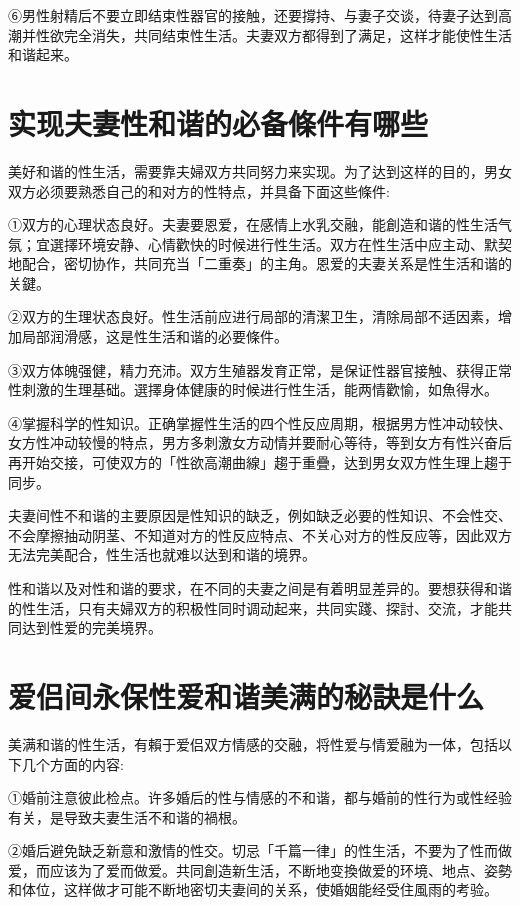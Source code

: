 \documentclass[12pt,UTF8]{ctexbook}
\begin{document}
⑥男性射精后不要立即结束性器官的接触，还要撐持、与妻子交谈，待妻子达到高潮并性欲完全消失，共同结束性生活。夫妻双方都得到了满足，这样才能使性生活和谐起来。

\section{实现夫妻性和谐的必备條件有哪些}

美好和谐的性生活，需要靠夫婦双方共同努力来实现。为了达到这样的目的，男女双方必须要熟悉自己的和对方的性特点，并具备下面这些條件:

①双方的心理状态良好。夫妻要恩爱，在感情上水乳交融，能創造和谐的性生活气氛；宜選擇环境安静、心情歡快的时候进行性生活。双方在性生活中应主动、默契地配合，密切协作，共同充当「二重奏」的主角。恩爱的夫妻关系是性生活和谐的关鍵。

②双方的生理状态良好。性生活前应进行局部的清潔卫生，清除局部不适因素，增加局部润滑感，这是性生活和谐的必要條件。

③双方体魄强健，精力充沛。双方生殖器发育正常，是保证性器官接触、获得正常性刺激的生理基础。選擇身体健康的时候进行性生活，能两情歡愉，如魚得水。

④掌握科学的性知识。正确掌握性生活的四个性反应周期，根据男方性冲动较快、女方性冲动较慢的特点，男方多刺激女方动情并要耐心等待，等到女方有性兴奋后再开始交接，可使双方的「性欲高潮曲線」趨于重疊，达到男女双方性生理上趨于同步。

夫妻间性不和谐的主要原因是性知识的缺乏，例如缺乏必要的性知识、不会性交、不会摩擦抽动阴茎、不知道对方的性反应特点、不关心对方的性反应等，因此双方无法完美配合，性生活也就难以达到和谐的境界。

性和谐以及对性和谐的要求，在不同的夫妻之间是有着明显差异的。要想获得和谐的性生活，只有夫婦双方的积极性同时调动起来，共同实踐、探討、交流，才能共同达到性爱的完美境界。

\section{爱侣间永保性爱和谐美满的秘訣是什么}

美满和谐的性生活，有賴于爱侣双方情感的交融，将性爱与情爱融为一体，包括以下几个方面的内容:

①婚前注意彼此检点。许多婚后的性与情感的不和谐，都与婚前的性行为或性经验有关，是导致夫妻生活不和谐的禍根。

②婚后避免缺乏新意和激情的性交。切忌「千篇一律」的性生活，不要为了性而做爱，而应该为了爱而做爱。共同創造新生活，不断地变換做爱的环境、地点、姿勢和体位，这样做才可能不断地密切夫妻间的关系，使婚姻能经受住風雨的考验。
\end{document}
